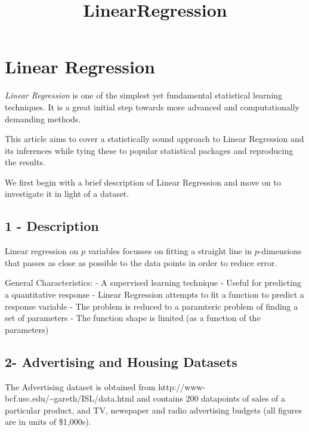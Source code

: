 \documentclass[11pt]{article}
\title{LinearRegression}
\begin{document}
    
    
    \maketitle
    
    

    
    \section{Linear Regression}\label{linear-regression}

\emph{Linear Regression} is one of the simplest yet fundamental
statistical learning techniques. It is a great initial step towards more
advanced and computationally demanding methods.

This article aims to cover a statistically sound approach to Linear
Regression and its inferences while tying these to popular statistical
packages and reproducing the results.

We first begin with a brief description of Linear Regression and move on
to investigate it in light of a dataset.

    \subsection{1 - Description}\label{description}

Linear regression on \(p\) variables focusses on fitting a straight line
in \(p\)-dimensions that passes as close as possible to the data points
in order to reduce error.

General Characteristics: - A supervised learning technique - Useful for
predicting a quantitative response - Linear Regression attempts to fit a
function to predict a response variable - The problem is reduced to a
paramteric problem of finding a set of parameters - The function shape
is limited (as a function of the parameters)

    \subsection{2- Advertising and Housing
Datasets}\label{advertising-and-housing-datasets}

The Advertising dataset is obtained from
http://www-bcf.usc.edu/\textasciitilde{}gareth/ISL/data.html and
contains 200 datapoints of sales of a particular product, and TV,
newspaper and radio advertising budgets (all figures are in units of
\$1,000s).
\end{document}
